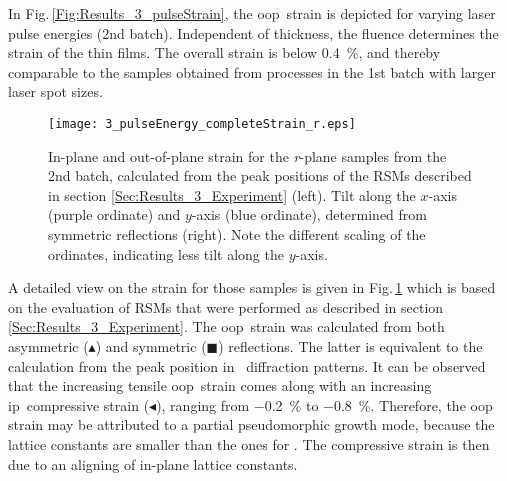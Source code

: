 In Fig.\,\ref{Fig:Results_3_pulseStrain}, the \gls{oop}\ strain is depicted for varying laser pulse energies (2nd batch).
Independent of thickness, the fluence determines the strain of the thin films.
The overall strain is below \qty{0.4}{\percent}, and thereby comparable to the samples obtained from processes in the 1st batch with larger laser spot sizes.
\begin{figure}
    \centering
    \texttt{[image: 3\_pulseEnergy\_completeStrain\_r.eps]}
    \caption{
        In-plane and out-of-plane strain for the \textit{r}-plane samples from the 2nd batch, calculated from the peak positions of the \glspl{RSM} described in section \ref{Sec:Results_3_Experiment} (left).
        Tilt along the $x$-axis (purple ordinate) and $y$-axis (blue ordinate), determined from symmetric reflections (right).
        Note the different scaling of the ordinates, indicating less tilt along the $y$-axis.
    }
    \label{Fig:Results_3_pulse_r_StrainTilt}
\end{figure}
A detailed view on the strain for those samples is given in Fig.\,\ref{Fig:Results_3_pulse_r_StrainTilt} which is based on the evaluation of \glspl{RSM} that were performed as described in section \ref{Sec:Results_3_Experiment}.
The \gls{oop}\ strain was calculated from both asymmetric (\textcolor{col-brightGreen}{$\blacktriangle$}) and symmetric (\textcolor{col-brightOrange}{$\blacksquare$}) reflections.
The latter is equivalent to the calculation from the peak position in \thetaomega\ diffraction patterns.
It can be observed that the increasing tensile \gls{oop}\ strain comes along with an increasing \gls{ip}\ compressive strain (\textcolor{col-purple}{$\blacktriangleleft$}), ranging from \qty{-0.2}{\percent} to \qty{-0.8}{\percent}.
Therefore, the \gls{oop} strain may be attributed to a partial pseudomorphic growth mode, because the  lattice constants are smaller than the ones for \cro.
The compressive strain is then due to an aligning of in-plane lattice constants.

